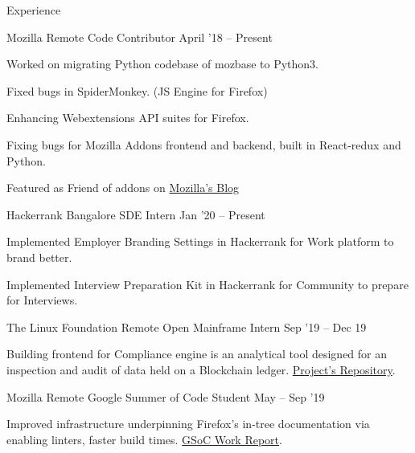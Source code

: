 \documentclass{resume} %
\begin{document}
\begin{rSection}{Experience}

    \begin{rWorkSection}{Mozilla}
                           {Remote}
                           {Code Contributor}
                           {April '18 -- Present}
  {
    \item Worked on migrating Python codebase of mozbase to Python3.
    \item Fixed bugs in SpiderMonkey. (JS Engine for Firefox)
    \item Enhancing Webextensions API suites for Firefox.
    \item Fixing bugs for Mozilla Addons frontend and backend, built in React-redux and Python.
    \item Featured as Friend of addons on \href{https://blog.mozilla.org/addons/2019/01/21/friend-of-add-ons-shivam-singhal/}{Mozilla's Blog}
  }
  \end{rWorkSection}

    \begin{rWorkSection}{Hackerrank}
                           {Bangalore}
                           {SDE Intern}
                           {Jan '20 -- Present}
  {
    \item Implemented Employer Branding Settings in Hackerrank for Work platform to brand better.
    \item Implemented Interview Preparation Kit in Hackerrank for Community to prepare for Interviews.
  }
  \end{rWorkSection}

  \begin{rWorkSection}{The Linux Foundation}
                           {Remote}
                           {Open Mainframe Intern}
                           {Sep '19 -- Dec 19}
  {
    \item Building frontend for Compliance engine is an analytical tool designed for an inspection and audit of data held on a Blockchain ledger. \href{https://github.com/openmainframeproject-internship/Compliance-Engine-2019/}{Project's Repository}.
  }
  \end{rWorkSection}

  \begin{rWorkSection}{Mozilla}
                      {Remote}
                      {Google Summer of Code Student}
                      {May -- Sep '19}
  {
    \item Improved infrastructure underpinning Firefox's in-tree documentation via enabling linters, faster build times. \href{http://bit.ly/GSoC19FF}{GSoC Work Report}.
  }
  \end{rWorkSection}


\end{rSection}
\end{document}
